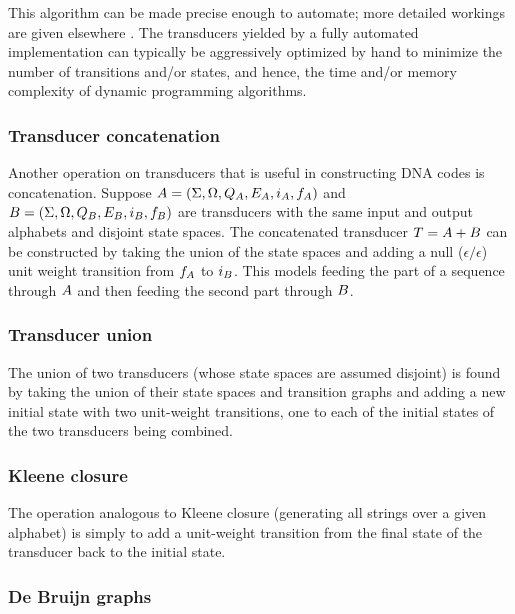 \documentclass[english]{article}
\begin{document}
This algorithm can be made precise enough to automate;
more detailed workings are given elsewhere \cite{PereiraRiley1996,MohriPereiraRiley2000,Holmes2003,Holmes2007,WestessonEtAlArxiv2012,WestessonEtAl2012}.
The transducers yielded by a fully automated implementation can typically be aggressively optimized by hand
to minimize the number of transitions and/or states,
and hence,
the time and/or memory complexity of dynamic programming algorithms.

\subsubsection{Transducer concatenation}

Another operation on transducers that is useful in constructing DNA codes
is concatenation.
Suppose
 $A = (\Sigma, \Omega, Q_{A}, E_{A}, i_{A}, f_{A})$ and
 $B = (\Sigma, \Omega, Q_{B}, E_{B}, i_{B}, f_{B})$
are transducers with the same input and output alphabets and disjoint state spaces.
The concatenated transducer $T = A + B$ can be constructed by
taking the union of the state spaces and adding a null ($\epsilon/\epsilon$) unit weight transition
from $f_{A}$ to $i_{B}$.
This models feeding the part of a sequence through $A$ and then feeding the second part through $B$.

\subsubsection{Transducer union}

The union of two transducers (whose state spaces are assumed disjoint)
is found by taking the union of their state spaces and transition graphs
and adding a new initial state with two unit-weight transitions, one to each of the initial states
of the two transducers being combined.

\subsubsection{Kleene closure}

The operation analogous to Kleene closure (generating all strings over a given alphabet)
is simply to add a unit-weight transition from the final state of the transducer back to the initial state.

\subsubsection{De Bruijn graphs}
\end{document}
